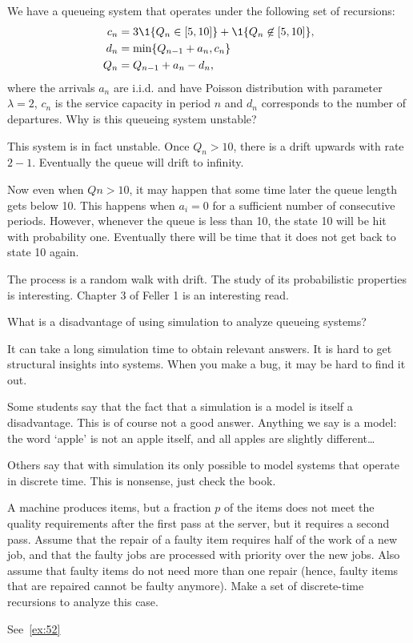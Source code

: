 \begin{exercise}[201807]
We have a queueing system that operates under the following set of recursions:
\begin{align*}
 c_n &= 3\1{Q_n \in [5, 10]} + \1{Q_n \not \in [5, 10]}, \\
d_n &= \min\{Q_{n-1}+a_n, c_n\} \\
Q_n &= Q_{n-1} + a_n - d_n,
\end{align*}
where the arrivals $a_n$ are i.i.d. and have Poisson distribution with parameter $\lambda=2$, $c_n$ is the service capacity in period $n$ and $d_n$ corresponds to the number of departures. Why is this queueing system unstable?
\begin{solution}
This system is in fact unstable. Once $Q_n > 10$, there is a drift upwards with rate $2-1$. Eventually the queue will drift to infinity. 

Now even when $Qn>10$, it may happen that some time later the queue length gets below 10. This happens when $a_i = 0$ for a sufficient number of consecutive periods. However, whenever the queue is less than 10, the state 10 will be hit with probability one. Eventually there will be time that it does not get back to state 10 again. 

The process is a random walk with drift. The study of its probabilistic properties is interesting. Chapter 3 of Feller 1 is an interesting read. 
\end{solution}
\end{exercise}


\begin{exercise}[201807]
 What is a disadvantage of using simulation to analyze queueing systems?
\begin{solution}
 It can take a long simulation time to obtain relevant answers. It is hard to get structural insights into systems. When you make a bug, it may be hard to find it out.

Some students say that the fact that a simulation is a model is itself a disadvantage. This is of course not a good answer. Anything we say is a model: the word `apple' is not an apple itself, and all apples are slightly different\ldots 

Others say that with simulation its only possible to model systems that operate in discrete time. This is nonsense, just check the book. 
\end{solution}
\end{exercise}


\begin{exercise}[201904]
 A machine produces items, but a fraction $p$ of the items does not meet the quality requirements after the first pass at the server, but it requires a second pass.
 Assume that the repair of a faulty item requires half of the work of a new job, and that the faulty jobs are processed with priority over the new jobs.
 Also assume that faulty items do not need more than one repair (hence, faulty items that are repaired cannot be faulty anymore).
 Make a set of discrete-time recursions to analyze this case.
\begin{solution}
See~\cref{ex:52}
\end{solution}
\end{exercise}


